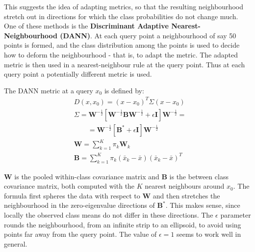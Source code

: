 \documentclass[12pt, letterpaper]{article}
\theoremstyle{definition}
\newcommand{\I}{\mathrm{\mathbf{I}}}
\begin{document}
This suggests the idea of adapting metrics, so that the resulting neighbourhood stretch out in directions for which the class probabilities do not change much. One of these methods is the \textbf{Discriminant Adaptive Nearest-Neighbourhood (DANN)}. 
At each query point a neighbourhood of say 50 points is formed, and the class distribution among the points is used to decide how to deform the neighbourhood - that is, to adapt the metric. The adapted metric is then used in a nearest-neighbour rule at the query point. Thus at each query point a potentially different metric is used.

The DANN metric at a query $x_0$ is defined by:
\begin{equation}
\begin{aligned}
&D(x,x_0) = (x-x_0)^T\Sigma (x-x_0)\\
&\Sigma = \mathbf{W}^{-\frac{1}{2}} \left[ \mathbf{W}^{-\frac{1}{2}}\mathbf{B}\mathbf{W}^{-\frac{1}{2}} + \epsilon \I \right] \mathbf{W}^{-\frac{1}{2}} = \\
&\quad\quad = \mathbf{W}^{-\frac{1}{2}}\left[ \mathbf{B}^*+\epsilon\I\right] \mathbf{W}^{-\frac{1}{2}}\\
&\mathbf{W} = \sum_{k=1}^K \pi_k  \mathbf{W}_k\\
& \mathbf{B} = \sum_{k=1}^K \pi_k  (\bar{x}_k - \bar{x})(\bar{x}_k - \bar{x})^T
\end{aligned}
\end{equation}

$ \mathbf{W}$ is the pooled within-class covariance matrix and $\mathbf{B}$ is the between class covariance matrix, both computed with the $K$ nearest neighbours around $x_0$.
The formula first spheres the data with respect to $\mathbf{W}$ and then stretches the neighbourhood in the zero-eigenvalue directions of $\mathbf{B}^*$.
This makes sense, since locally the observed class means do not differ in these directions. The $\epsilon$ parameter rounds the neighbourhood, from an infinite strip to an ellipsoid, to avoid using points far away from the query point. The value of $\epsilon = 1$ seems to work well in general.
\end{document}
